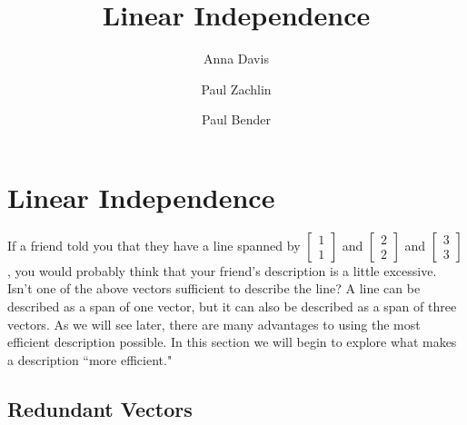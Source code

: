 \documentclass{ximera}
\author{Anna Davis \and Paul Zachlin \and Paul Bender} \title{Linear Independence} \license{CC-BY 4.0}
\begin{document}
\begin{abstract}
 \end{abstract}
\maketitle

\section*{Linear Independence}
If a friend told you that they have a line spanned by $\begin{bmatrix}1\\1\end{bmatrix}$ and $\begin{bmatrix}2\\2\end{bmatrix}$ and $\begin{bmatrix}3\\3\end{bmatrix}$, you would probably think that your friend's description is a little excessive.  Isn't one of the above vectors sufficient to describe the line?  A line can be described as a span of one vector, but it can also be described as a span of three vectors.  As we will see later, there are many advantages to using the most efficient description possible.  In this section we will begin to explore what makes a description ``more efficient."
\subsection*{Redundant Vectors}
\end{document}
